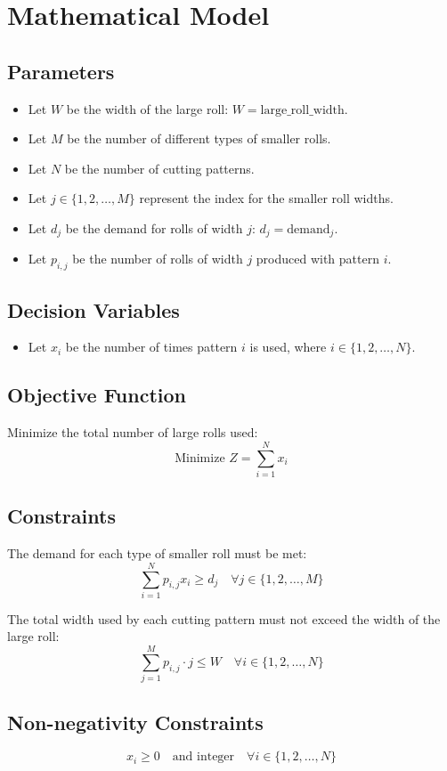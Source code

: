 \documentclass{article}
\begin{document}
\section*{Mathematical Model}

\subsection*{Parameters}
\begin{itemize}
  \item Let $W$ be the width of the large roll: $W = \text{large\_roll\_width}$.
  \item Let $M$ be the number of different types of smaller rolls.
  \item Let $N$ be the number of cutting patterns.
  \item Let $j \in \{1, 2, \ldots, M\}$ represent the index for the smaller roll widths.
  \item Let $d_j$ be the demand for rolls of width $j$: $d_j = \text{demand}_j$.
  \item Let $p_{i,j}$ be the number of rolls of width $j$ produced with pattern $i$.
\end{itemize}

\subsection*{Decision Variables}
\begin{itemize}
  \item Let $x_i$ be the number of times pattern $i$ is used, where $i \in \{1, 2, \ldots, N\}$.
\end{itemize}

\subsection*{Objective Function}
Minimize the total number of large rolls used:
\[
\text{Minimize } Z = \sum_{i=1}^{N} x_i
\]

\subsection*{Constraints}
The demand for each type of smaller roll must be met:
\[
\sum_{i=1}^{N} p_{i,j} x_i \geq d_j \quad \forall j \in \{1, 2, \ldots, M\}
\]

The total width used by each cutting pattern must not exceed the width of the large roll:
\[
\sum_{j=1}^{M} p_{i,j} \cdot j \leq W \quad \forall i \in \{1, 2, \ldots, N\}
\]

\subsection*{Non-negativity Constraints}
\[
x_i \geq 0 \quad \text{and integer} \quad \forall i \in \{1, 2, \ldots, N\}
\]
\end{document}
